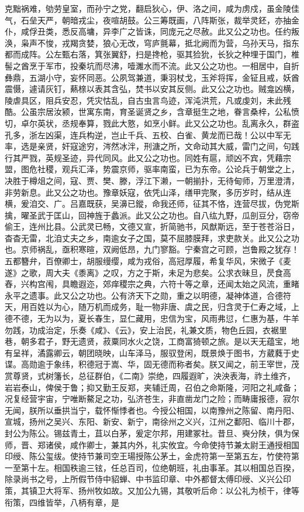 \documentclass[]{article}
\begin{document}
克黜祸难，劬劳皇室，而孙宁之党，翻启狄心，伊、洛之间，咸为虏戍，虽金陵佳气，石垒天严，朝暗戎尘，夜喧胡鼓。公三筹既画，八阵斯张，裁举灵鉟，亦抽金仆，咸俘丑类，悉反高墉，异李广之皆诛，同庞元之尽赦。此又公之功也。任约叛涣，枭声不悛，戎羯贪婪，狼心无改，穹庐氈幕，抵北阙而为营，乌孙天马，指东都而成阵。公左甄右落，箕张翼舒，扫是搀枪，驱其猃狁，长狄之种埋于国门，椎髻之酋烹于军市，投秦坑而尽沸，噎濉水而不流。此又公之功也。一相居中，自折彝鼎，五湖小守，妄怀同恶。公夙驾兼道，秉羽杖戈，玉斧将挥，金钲且戒，妖酋震慑，遽请灰钉，爇榇以表其含弘，焚书以安其反侧。此又公之功也。贼龛凶横，陵虐具区，阻兵安忍，凭灾怙乱，自古虫言鸟迹，浑沌洪荒，凡或虔刘，未此残酷。公虽宗居汝颍，世寓东南，育圣诞贤之乡，含章挺生之地，眷言桑梓，公私愤切，卓尔英状，丞规奉算，戮此大憝，如烹小鲜。此又公之功也。乱离永久，群盗孔多，浙左凶渠，连兵构逆，岂止千兵、五校、白雀、黄龙而已哉！公以中军无率，选是亲贤，奸寇途穷，涔然冰泮，刑溏之所，文命动其大威，雷门之间，句践行其严戮，英规圣迹，异代同风。此又公之功也。同姓有扈，顽凶不宾，凭藉宗盟，图危社稷，观兵汇泽，势震京师，驱率南蛮，已为东帝。公论兵于朝堂之上，决胜于樽俎之间，寇、贾、樊、滕，浮江下濑，一朝揃扑，无待甸师，万里澄清，非劳新息。此又公之功也。豫章妖寇，依凭山泽，缮甲完聚，多历岁时，结从连横，爰洎交、广。吕嘉既获，吴濞已鏦，命我还师，征其不恪，连营尽拔，伪党斯擒，曜圣武于匡山，回神旌于蠡派。此又公之功也。自八纮九野，瓜剖豆分，窃帝偷王，连州比县。公武灵已畅，文德又宣，折简驰书，风猷斯远，至于苍苍浴日，杳杳无雷，北洎丈夫之乡，南逾女子之国，莫不屈膝膜拜，求吏款关。此又公之功也。京师祸乱，亟积寒暄，双阙低昂，九门寥豁。宁秦宫之可顾，岂鲁殿之犹存！五都簪弁，百僚卿士，胡服缦缨，咸为戎俗，高冠厚履，希复华风，宋微子《麦遂》之歌，周大夫《黍离》之叹，方之于斯，未足为悲矣。公求衣昧旦，昃食高舂，兴构宫闱，具瞻遐迩，郊痒稷宗之典，六符十等之章，还闻太始之风流，重睹永平之遗事。此又公之功也。公有济天下之勋，重之以明德，凝神体道，合德符天，用百姓以为心，随万机而成务，耻一物非唐、虞之民，归含灵于仁寿之域，上德不德，无为以为，夏长春生，显仁藏用，忠信为宝，风雨弗愆，仁惠为基，牛羊勿践，功成治定，乐奏《咸》、《云》，安上治民，礼兼文质，物色丘园，衣裾里巷，朝多君子，野无遗贤，菽粟同水火之饶，工商富猗顿之旅。是以天无蕴宝，地有呈祥，潏露卿云，朝团晓映，山车泽马，服驭登闲，既景焕于图书，方葳蕤于史谍。高勋逾于象纬，积德冠于嵩、华，固无德而称者矣。朕又闻之，前王宰世，茂赏尊贤，式树籓长，总征群伯，《二南》崇绝，四履遐旷，泱泱表海，祚土维齐，岩岩泰山，俾侯于鲁；抑又勤王反郑，夹辅迁周，召伯之命斯隆，河阳之礼咸备；况复经营宇宙，宁唯断鰲足之功，弘济苍生，非直凿龙门之险；而畴庸报德，寂尔无闻，朕所以垂拱当宁，载怀惭悸者也。今授公相国，以南豫州之陈留、南丹阳、宣城，扬州之吴兴、东阳、新安、新宁，南徐州之义兴，江州之鄱阳、临川十郡，封公为陈公。锡兹青土，苴以白茅，爰定尔邦，用建冢社。昔旦、奭分陕，俱为保师，晋、郑诸侯，咸作卿士，兼其内外，礼实攸宜。今命使持节兼太尉王通授相国印绶、陈公玺绂。使持节兼司空王瑒授陈公茅土，金虎符第一至第五左，竹使符第一至第十左。相国秩逾三铉，任总百司，位绝朝班，礼由事革。其以相国总百揆，除录尚书之号，上所假节侍中貂蝉、中书监印章、中外都督太傅印绶、义兴公印策，其镇卫大将军、扬州牧如故。又加公九锡，其敬听后命：以公礼为桢干，律等衔策，四维皆举，八柄有章，是
\end{document}
